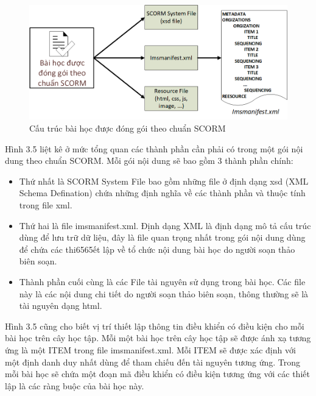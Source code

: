 	\begin{center}
	\begin{figure}[htp]
		\begin{center}
			\includegraphics[width=15cm]{Chapter3/Pictures/picture35.png}
		\end{center}
		\caption{Cấu trúc bài học được đóng gói theo chuẩn SCORM}
		\label{refpicture46}
	\end{figure}
\end{center}




	Hình 3.5 liệt kê ở mức tổng quan các thành phần cần phải có trong một gói nội dung theo chuẩn SCORM. Mỗi gói nội dung sẽ bao gồm 3 thành phần chính:
	\begin{itemize}
		\item Thứ nhất là SCORM System File bao gồm những file ở định dạng xsd (XML Schema Defination) chứa những định nghĩa về các thành phần và thuộc tính trong file xml. 
		
		\item Thứ hai là file imsmanifest.xml. Định dạng XML là định dạng mô tả cấu trúc dùng để lưu trữ dữ liệu, đây là file quan trọng nhất trong gói nội dung dùng để chứa các thi6565ết lập về tổ chức nội dung bài học do người soạn thảo biên soạn. 
		
		\item Thành phần cuối cùng là các File tài nguyên sử dụng trong bài học. Các file này là các nội dung chi tiết do người soạn thảo biên soạn, thông thường sẽ là tài nguyên dạng html.
	\end{itemize}
	
	Hình 3.5 cũng cho biết vị trí thiết lập thông tin điều khiển có điều kiện cho mỗi bài học trên cây học tập. Mỗi một bài học trên cây học tập sẽ được ánh xạ tương ứng là một ITEM trong file imsmanifest.xml. Mỗi ITEM sẽ được xác định với một định danh duy nhất dùng để tham chiếu đến tài nguyên tương ứng. Trong mỗi bài học sẽ chứa một đoạn mã điều khiển có điều kiện tương ứng với các thiết lập là các ràng buộc của bài học này.\\
	 
